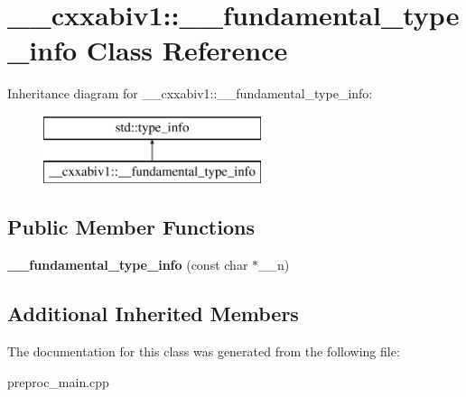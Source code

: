 \hypertarget{class____cxxabiv1_1_1____fundamental__type__info}{\section{\+\_\+\+\_\+cxxabiv1\+:\+:\+\_\+\+\_\+fundamental\+\_\+type\+\_\+info Class Reference}
\label{class____cxxabiv1_1_1____fundamental__type__info}
}
Inheritance diagram for \+\_\+\+\_\+cxxabiv1\+:\+:\+\_\+\+\_\+fundamental\+\_\+type\+\_\+info\+:\begin{figure}[H]
\begin{center}
\leavevmode
\includegraphics[height=2.000000cm]{class____cxxabiv1_1_1____fundamental__type__info}
\end{center}
\end{figure}
\subsection*{Public Member Functions}
\begin{DoxyCompactItemize}
\item 
\hypertarget{class____cxxabiv1_1_1____fundamental__type__info_afd9ae32b955bf5c8130178c4c3674a14}{{\bfseries \+\_\+\+\_\+fundamental\+\_\+type\+\_\+info} (const char $\ast$\+\_\+\+\_\+n)}\label{class____cxxabiv1_1_1____fundamental__type__info_afd9ae32b955bf5c8130178c4c3674a14}

\end{DoxyCompactItemize}
\subsection*{Additional Inherited Members}


The documentation for this class was generated from the following file\+:\begin{DoxyCompactItemize}
\item 
preproc\+\_\+main.\+cpp\end{DoxyCompactItemize}

